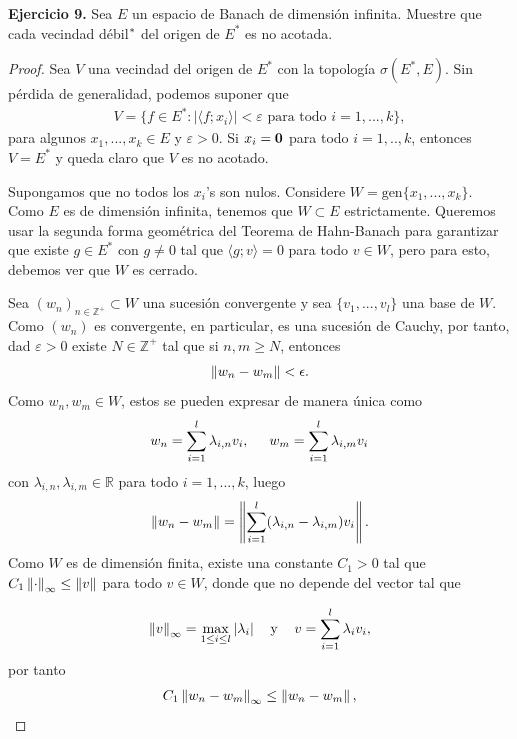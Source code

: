 


\textbf{Ejercicio 9.} Sea $E$ un espacio de Banach de dimensión infinita. Muestre que cada vecindad débil$\empty^*$ del origen de $E^*$ es no acotada.

\begin{proof}
    Sea $V$ una vecindad del origen de $E^*$ con la topología $\sigma(E^*,E)$. Sin pérdida de generalidad, podemos suponer que
    \begin{align*}
        V=\{f \in E^*:|\langle f;x_i\rangle|<\varepsilon \text{ para todo } i=1,...,k\},
    \end{align*}
    para algunos $x_1,...,x_k\in E$ y $\varepsilon>0$. Si $x_i=\mathbf{0}$ para todo $i=1,..,k$, entonces $V=E^*$ y queda claro que $V$ es no acotado.
    
    Supongamos que no todos los $x_i$'s son nulos. Considere $W=\text{gen}\{x_1,...,x_k\}$. Como $E$ es de dimensión infinita, tenemos que $W\subset E$ estrictamente. Queremos usar la segunda forma geométrica del Teorema de Hahn-Banach para garantizar que existe $g\in E^*$ con $g\neq 0$ tal que $\langle g;v\rangle=0$ para todo $v \in W$, pero para esto, debemos ver que $W$ es cerrado.
    
    Sea $(w_n)_{n \in \mathbb{Z}^+}\subset W$ una sucesión convergente y sea $\{v_1,...,v_l\}$ una base de $W$. Como $(w_n)$ es convergente, en particular, es una sucesión de Cauchy, por tanto, dad $\varepsilon>0$ existe $N\in \mathbb{Z}^+$ tal que si $n,m\geq N$, entonces
    \begin{align*}
        \left\|w_n-w_m\right\|<\epsilon.
    \end{align*}
    Como $w_n,w_m\in W$, estos se pueden expresar de manera única como
    \begin{align*}
        w_n=\sum_{i=1}^l \lambda_{i,n} v_i, \hspace{5mm} w_m=\sum_{i=1}^l \lambda_{i,m}v_i 
    \end{align*}
    con $\lambda_{i,n},\lambda_{i,m}\in \mathbb{R}$ para todo $i=1,...,k$, luego
    \begin{align*}
        \left\|w_n-w_m\right\|=\left\|\sum_{i=1}^l(\lambda_{i,n}-\lambda_{i,m})v_i\right\|.
    \end{align*}
    Como $W$ es de dimensión finita, existe una constante $C_1>0$ tal que $C_1\left\|\cdot\right\|_\infty\leq \left\|v\right\|$ para todo $v \in W$, donde que no depende del vector tal que 

    \begin{align*}
        \left\|v\right\|_\infty=\max_{1\leq i\leq l} |\lambda_i| \hspace{3mm} \text{ y } \hspace{3mm} v=\sum_{i=1}^l \lambda_i v_i,
    \end{align*}
    por tanto
    \begin{align*}
        C_1\left\|w_n-w_m\right\|_\infty\leq \left\|w_n-w_m\right\|,
    \end{align*}
    

\end{proof}
